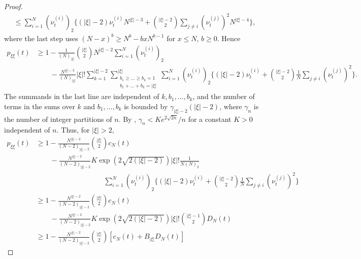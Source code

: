 \begin{proof}
\begin{align*}
&\leq \sum_{ i = 1 }^N ( \nu_t^{ ( i ) } )_2 \Bigg\{ ( | \xi | - 2 ) \nu_t^{ ( i ) } N^{ | \xi | - 3 } + \binom{ | \xi | - 2 }{ 2 } \sum_{ j \neq i } ( \nu_t^{ ( j ) } )^2 N^{ | \xi | - 4 } \Bigg\},
\end{align*}
where the last step uses $(N - x)^b \geq N^b - b x N^{ b - 1 }$ for $x \leq N$, $b \geq 0$.
Hence
\begin{align*}
p_{ \xi \xi }( t ) 
&\geq 1 - \frac{ 1 }{ ( N )_{ | \xi | } } \binom{|\xi|}{2}
        N^{ | \xi | - 2 } \sum_{ i = 1 }^N ( \nu_t^{ ( i ) } )_2 \\
    &\qquad- \frac{ N^{|\xi|-3} }{ ( N )_{ | \xi | } } |\xi|!
        \sum_{ k = 1 }^{ | \xi | - 2 } 
        \sum_{ \substack{ b_1 \geq \ldots \geq b_k = 1 
        \\ b_1 + \ldots + b_k = | \xi | } }^{ | \xi | } 
        \sum_{ i = 1 }^N ( \nu_t^{ ( i ) } )_2 
        \Bigg\{ ( | \xi | - 2 ) \nu_t^{ ( i ) } + \binom{ | \xi | - 2 }{ 2 } \frac{1}{N} 
        \sum_{ j \neq i } ( \nu_t^{ ( j ) } )^2 \Bigg\} .
\end{align*}
The summands in the last line are independent of $k, b_1, \dots, b_k$, and the number of terms in the sums over $k$ and $b_1, \dots, b_k$ is bounded by $\gamma_{|\xi|-2} (|\xi|-2)$, where $\gamma_n$ is the number of integer partitions of $n$.
By \textcite[Section 2]{hardy1918}, $\gamma_n < K e^{ 2 \sqrt{ 2 n } } / n$ for a constant $K > 0$ independent of $n$.
Thus, for $|\xi| > 2$,
\begin{align*}
p_{ \xi \xi }( t ) 
&\geq 1 - \frac{ N^{ | \xi | - 2 } }{ ( N-2 )_{ | \xi | -2} } \binom{|\xi|}{2}
        c_N(t) \\
    &\qquad- \frac{ N^{|\xi|-2} }{ ( N-2 )_{ | \xi | -2} }
        K \exp( 2 \sqrt{2(|\xi|-2)} ) |\xi|!
        \frac{1}{N(N)_2} \\
    &\hspace{4cm} \sum_{ i = 1 }^N ( \nu_t^{ ( i ) } )_2
        \Bigg\{ ( | \xi | - 2 ) \nu_t^{ ( i ) } + \binom{ | \xi | - 2 }{ 2 } \frac{1}{N} 
        \sum_{ j \neq i } ( \nu_t^{ ( j ) } )^2 \Bigg\} \\
&\geq 1 - \frac{ N^{ | \xi | - 2 } }{ ( N-2 )_{ | \xi | -2} } \binom{|\xi|}{2}
        c_N(t) \\
    &\qquad- \frac{ N^{|\xi|-2} }{ ( N-2 )_{ | \xi | -2} }
        K \exp( 2 \sqrt{2(|\xi|-2)} ) |\xi|! \binom{ |\xi|-1}{2} D_N(t) \\
&\geq 1 - \frac{ N^{ | \xi | - 2 } }{ ( N-2 )_{ | \xi | -2} } \binom{|\xi|}{2}
        \left[ c_N(t) + B_{|\xi|} D_N(t) \right]
\end{align*}

\end{proof}

